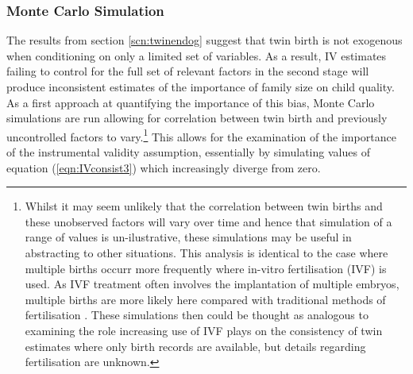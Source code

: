 \documentclass{article}[11pt,subeqn]
\begin{document}
\begin{spacing}{1.5}
\subsubsection{Monte Carlo Simulation}
\label{scn:MCS}
The results from section \ref{scn:twinendog} suggest that twin birth is not exogenous when conditioning on only a limited set of variables. As a result, 
IV estimates failing to control for the full set of 
relevant factors in the second stage will produce inconsistent estimates of the importance of family size on child quality.  As a first 
approach at quantifying the importance of this bias, Monte Carlo simulations are run allowing for correlation between twin birth and previously uncontrolled factors
to vary.\footnote{Whilst it may seem unlikely that the correlation between twin births and these unobserved factors will vary over time and hence that
simulation of a range of values is un-ilustrative, these simulations may be useful in abstracting to other situations.  This analysis is identical to the
case where multiple births occurr more frequently where in-vitro fertilisation (IVF) is used.  As IVF treatment often involves the implantation of 
multiple embryos, multiple births are more likely here compared with traditional methods of fertilisation \citep{Beraletal1990}.  These simulations then could be 
thought as analogous to examining the role increasing use of IVF plays on the consistency of twin estimates where only birth records are available, 
but details regarding fertilisation are unknown.}  This allows for the examination of the importance of the instrumental validity assumption, essentially
by simulating values of equation (\ref{eqn:IVconsist3}) which increasingly diverge from zero. 


\end{spacing}
\end{document}
